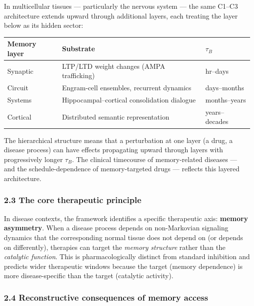 \documentclass[
]{article}
\begin{document}
In multicellular tissues --- particularly the nervous system --- the
same C1--C3 architecture extends upward through additional layers, each
treating the layer below as its hidden sector:

\begin{longtable}[]{@{}lll@{}}
\toprule\noalign{}
Memory layer & Substrate & \(\tau_B\) \\
\midrule\noalign{}
\endhead
\bottomrule\noalign{}
\endlastfoot
Synaptic & LTP/LTD weight changes (AMPA trafficking) & hr--days \\
Circuit & Engram-cell ensembles, recurrent dynamics & days--months \\
Systems & Hippocampal--cortical consolidation dialogue &
months--years \\
Cortical & Distributed semantic representation & years--decades \\
\end{longtable}

The hierarchical structure means that a perturbation at one layer (a
drug, a disease process) can have effects propagating upward through
layers with progressively longer \(\tau_B\). The clinical timecourse of
memory-related diseases --- and the schedule-dependence of
memory-targeted drugs --- reflects this layered architecture.

\hypertarget{the-core-therapeutic-principle}{%
\subsubsection{2.3 The core therapeutic
principle}\label{the-core-therapeutic-principle}}

In disease contexts, the framework identifies a specific therapeutic
axis: \textbf{memory asymmetry}. When a disease process depends on
non-Markovian signaling dynamics that the corresponding normal tissue
does not depend on (or depends on differently), therapies can target the
\emph{memory structure} rather than the \emph{catalytic function}. This
is pharmacologically distinct from standard inhibition and predicts
wider therapeutic windows because the target (memory dependence) is more
disease-specific than the target (catalytic activity).

\hypertarget{reconstructive-consequences-of-memory-access}{%
\subsubsection{2.4 Reconstructive consequences of memory
access}\label{reconstructive-consequences-of-memory-access}}
\end{document}
